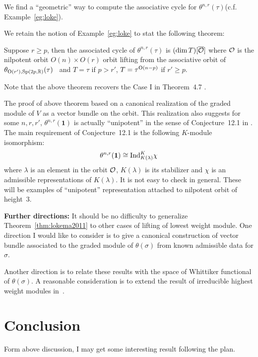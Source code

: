 \documentclass{amsart}
\begin{document}
We find a ``geometric'' way to compute the associative cycle for
$\theta^{n,r}(\tau)$(c.f. Example~\ref{eg:loke}).

We retain the notion of Example~\ref{eg:loke} to stat the following theorem:
\begin{thm} \label{thm:lokema2011}
Suppose $r\geq p$, then the associated cycle of $\theta^{n,r}(\tau)$ is 
$(\dim T)[\overline{\mathcal{O}}]$ where $\mathcal{O}$ is the nilpotent orbit $O(n)\times O(r)$ orbit lifting from the associative
orbit of $\theta_{{\rm O}(r'),{\rm Sp}(2p,{\mathbb{R}})}(\tau)$~\cite{NishyamaZhu2004} 
and $T= \tau$ if $p>r'$, $T=\tau^{{\rm O}(n-p)}$ if $r'\geq p$.  
\end{thm}
Note that the above theorem recovers the Case I in Theorem~4.7  \cite{NishyamaZhu2004}.

The proof of above theorem based on a canonical realization of the
graded module of $V$ as a vector bundle on the orbit. This realization
also suggests for some  $n,r,r'$,  $\theta^{n,r}(\mathbf{1})$ is
actually ``unipotent''  in the sense of Conjecture~12.1 in
\cite{Vogan1989Var}. The main requirement of Conjecture~12.1 is the
following $K$-module isomorphism:
 \[
\theta^{n,r}(\mathbf{1})\cong {\rm Ind}_{K(\lambda)}^K\chi
\]
where $\lambda$ is an element in the orbit $\mathcal{O}$, $K(\lambda)$ is its
stabilizer and 
$\chi$ is an  admissible representations of $K(\lambda)$.
It is not easy to check in general.
These will be examples of ``unipotent'' representation attached to
nilpotent orbit of height~3. 



{\bf Further directions:} It should be no difficulty to generalize Theorem~\ref{thm:lokema2011}
to other cases of lifting of lowest weight module. One direction I would like to consider
is to give a canonical construction of vector bundle associated to
the graded module of $\theta(\sigma)$ from known admissible data for $\sigma$.

Another direction is to relate these results with the space of
Whittiker functional of $\theta(\sigma)$. A reasonable consideration
is to extend the result of irreducible highest weight modules in~\cite{Yamashita2001cayley}.

\section{Conclusion}
Form above discussion, I may get some interesting result following the plan.

{}

\end{document}
